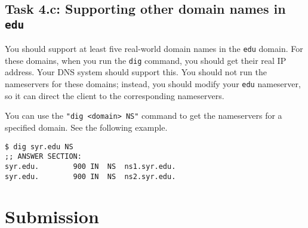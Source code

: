 \subsection{Task 4.c: Supporting other domain names in \texttt{edu}}


You should support at least five real-world domain names 
in the \texttt{edu} domain. For these domains, when you run
the \texttt{dig} command, you should get their real IP address. Your
DNS system should support this. You should not run 
the nameservers for these domains; instead, you should modify
your \texttt{edu} nameserver, so it can direct the client
to the corresponding nameservers. 


You can use the \texttt{"dig <domain> NS"} command to get the nameservers
for a specified domain. See the following example. 

\begin{lstlisting}
$ dig syr.edu NS 
;; ANSWER SECTION:
syr.edu.		900	IN	NS	ns1.syr.edu.
syr.edu.		900	IN	NS	ns2.syr.edu.
\end{lstlisting}
 

 





\section{Submission}

\seedsubmission



